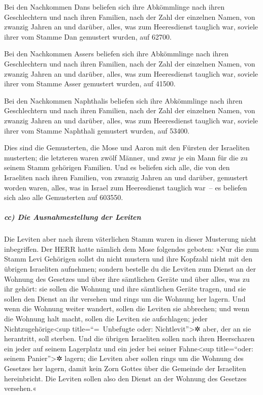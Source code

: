 Bei den Nachkommen Dans beliefen sich ihre Abkömmlinge
nach ihren Geschlechtern und nach ihren Familien, nach der Zahl der
einzelnen Namen, von zwanzig Jahren an und darüber, alles, was zum
Heeresdienst tauglich war, soviele ihrer vom Stamme Dan
gemustert wurden, auf 62700.

Bei den Nachkommen Assers beliefen sich ihre Abkömmlinge
nach ihren Geschlechtern und nach ihren Familien, nach der Zahl der
einzelnen Namen, von zwanzig Jahren an und darüber, alles, was zum
Heeresdienst tauglich war, soviele ihrer vom Stamme Asser
gemustert wurden, auf 41500.

Bei den Nachkommen Naphthalis beliefen sich ihre
Abkömmlinge nach ihren Geschlechtern und nach ihren Familien, nach der
Zahl der einzelnen Namen, von zwanzig Jahren an und darüber, alles, was
zum Heeresdienst tauglich war, soviele ihrer vom Stamme
Naphthali gemustert wurden, auf 53400.

Dies sind die Gemusterten, die Mose und Aaron mit den
Fürsten der Israeliten musterten; die letzteren waren zwölf Männer, und
zwar je ein Mann für die zu seinem Stamm gehörigen Familien.
Und es beliefen sich alle, die von den Israeliten nach
ihren Familien, von zwanzig Jahren an und darüber, gemustert worden
waren, alles, was in Israel zum Heeresdienst tauglich war~--
es beliefen sich also alle Gemusterten auf 603550.

\hypertarget{cc-die-ausnahmestellung-der-leviten}{%
\subparagraph{cc) Die Ausnahmestellung der
Leviten}\label{cc-die-ausnahmestellung-der-leviten}}

Die Leviten aber nach ihrem väterlichen Stamm waren in
dieser Musterung nicht inbegriffen. Der HERR hatte
nämlich dem Mose folgendes geboten: »Nur die zum Stamm
Levi Gehörigen sollst du nicht mustern und ihre Kopfzahl nicht mit den
übrigen Israeliten aufnehmen; sondern bestelle du die
Leviten zum Dienst an der Wohnung des Gesetzes und über ihre sämtlichen
Geräte und über alles, was zu ihr gehört: sie sollen die Wohnung und
ihre sämtlichen Geräte tragen, und sie sollen den Dienst an ihr versehen
und rings um die Wohnung her lagern. Und wenn die Wohnung
weiter wandert, sollen die Leviten sie abbrechen; und wenn die Wohnung
halt macht, sollen die Leviten sie aufschlagen; jeder
Nichtzugehörige\textless sup title=``=~Unbefugte oder:
Nichtlevit''\textgreater✲ aber, der an sie herantritt, soll sterben.
Und die übrigen Israeliten sollen nach ihren Heerscharen
ein jeder auf seinem Lagerplatz und ein jeder bei seiner
Fahne\textless sup title=``oder: seinem Panier''\textgreater✲ lagern;
die Leviten aber sollen rings um die Wohnung des Gesetzes
her lagern, damit kein Zorn Gottes über die Gemeinde der Israeliten
hereinbricht. Die Leviten sollen also den Dienst an der Wohnung des
Gesetzes versehen.«

